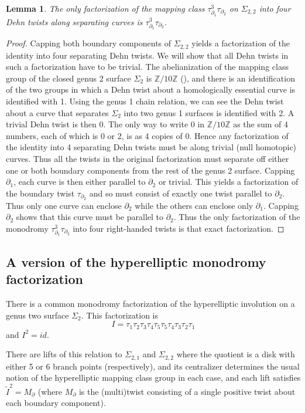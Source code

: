 \documentclass[11pt,letterpaper,reqno]{amsart}
\newtheorem{lemma}[theorem]{Lemma}
\theoremstyle{remark}
\newcommand{\ZZ}{{\mathbb Z}}
\begin{document}
\begin{lemma} The only factorization of the mapping class  $\tau_{\partial_1}^3\tau_{\partial_2}$ on $\Sigma_{2,2}$ into four Dehn twists along separating curves is $\tau_{\partial_1}^3\tau_{\partial_2}$.
\end{lemma}
\begin{proof}
Capping both boundary components of $\Sigma_{2,2}$ yields a factorization of the identity into four separating Dehn twists. We will show that all Dehn twists in such a factorization have to be trivial. The abelianization of the mapping class group of the closed genus 2 surface $\Sigma_2$ is $\ZZ/10 \ZZ$ (\cite{Korkmaz}), and there is an identification of the two groups in which a Dehn twist about a homologically essential curve is identified with 1. Using the genus 1 chain relation, we can see the Dehn twist about a curve that separates $\Sigma_2$ into two genus 1 surfaces is identified with 2. A trivial Dehn twist is then 0. The only way to write 0 in $\ZZ/10 \ZZ$ as the sum of 4 numbers, each of which is 0 or 2, is as 4 copies of 0. Hence any factorization of the identity into 4 separating Dehn twists must be along trivial (null homotopic) curves. Thus all the twists in the original factorization must separate off either one or both boundary components from the rest of the genus 2 surface. Capping $\partial_1$, each curve is then either parallel to $\partial_2$ or trivial. This yields a factorization of the boundary twist $\tau_{\partial_2}$ and so must consist of exactly one twist parallel to $\partial_2$. Thus only one curve can enclose $\partial_2$ while the others can enclose only $\partial_1$. Capping $\partial_2$ shows that this curve must be parallel to $\partial_2$. Thus the only factorization of the monodromy $\tau_{\partial_1}^3\tau_{\partial_2}$ into four right-handed twists is that exact factorization. 
\end{proof}




\subsection{A version of the hyperelliptic monodromy factorization}
\label{sec:hyperelliptic}

There is a common monodromy factorization of the hyperelliptic involution on a genus two surface $\Sigma_2$. This factorization is
\[ I = \tau_1 \tau_2 \tau_3 \tau_4 \tau_5 \tau_5 \tau_4 \tau_3 \tau_2 \tau_1\]
and $I^2 = id$.

There are lifts of this relation to $\Sigma_{2,1}$ and $\Sigma_{2,2}$ where the quotient is a disk with either 5 or 6 branch points (respectively), and its centralizer determines the usual notion of the hyperelliptic mapping class group in each case, and each lift satisfies $\tilde{I}^2 = M_\partial$ (where $M_\partial$ is the (multi)twist consisting of a single positive twist about each boundary component). 
\end{document}

